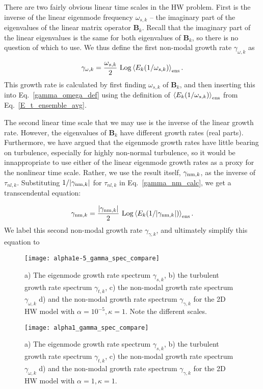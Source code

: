 \documentclass[letter,scriptaddress,twocolumn, prl,showkeys]{revtex4}
\def\beq{\begin{equation}}
\def\eeq{\end{equation}}
\begin{document}
There are two fairly obvious linear time scales in the HW problem. First is the inverse of the linear eigenmode frequency $\omega_{s,k}$
-- the imaginary part of the eigenvalues of the linear matrix operator $\mathbf{B}_k$.
Recall that the imaginary part of the linear eigenvalues is the same for both eigenvalues of $\mathbf{B}_k$, so there is no question of which to use. We thus define the first non-modal
growth rate $\gamma_{\omega,k}$ as

\beq
\label{gamma_omega_def}
\gamma_{\omega,k} = \frac{\omega_{s,k}}{2} \ {\rm{Log}} \left< E_k(1/\omega_{s,k}) \right>_{\rm{ens}}.
\eeq
This growth rate is calculated by first finding $\omega_{s,k}$ of $\mathbf{B}_k$, and then inserting this into Eq.~\ref{gamma_omega_def} using the definition of 
$\left< E_k(1/\omega_{s,k}) \right>_{\rm{ens}}$ from Eq.~\ref{E_t_ensemble_avg}.

The second linear time scale that we may use is the inverse of the linear growth rate. However, the eigenvalues of $\mathbf{B}_k$ have different growth rates (real parts). 
Furthermore, we have argued that the eigenmode growth rates have little bearing on turbulence, especially for highly non-normal turbulence, 
so it would be innappropriate to use either of the linear eigenmode growth rates as a proxy for the nonlinear time scale.
Rather, we use the result itself, $\gamma_{{\rm{nm}},k}$, as the inverse of $\tau_{nl,k}$. Substituting $1/|\gamma_{{\rm{nm}},k}|$ for $\tau_{nl,k}$ in Eq.~\ref{gamma_nm_calc}, we get
a transcendental equation:

\beq
\label{trans_gamma_nm}
\gamma_{{\rm{nm}},k} = \frac{|\gamma_{{\rm{nm}},k}|}{2} \ {\rm{Log}} \left< E_k(1/|\gamma_{{\rm{nm}},k}|) \right>_{\rm{ens}}.
\eeq
We label this second non-modal growth rate $\gamma_{\gamma,k}$, and ultimately simplify this equation to

\begin{figure}
\centerline{\texttt{[image: alpha1e-5\_gamma\_spec\_compare]}}
\caption{a) The eigenmode growth rate spectrum $\gamma_{s,k}$,  b) the turbulent growth rate spectrum $\gamma_{t,k}$, c) the non-modal growth rate spectrum $\gamma_{\omega,k}$ d) and the 
non-modal growth rate spectrum $\gamma_{\gamma,k}$ for the 2D HW model with $\alpha = 10^{-5}, \kappa=1$. Note the different scales.}
\label{alpha1e-5_gamma_spec_compare}
\end{figure}

\begin{figure}
\centerline{\texttt{[image: alpha1\_gamma\_spec\_compare]}}
\caption{a) The eigenmode growth rate spectrum $\gamma_{s,k}$,  b) the turbulent growth rate spectrum $\gamma_{t,k}$, c) the non-modal growth rate spectrum $\gamma_{\omega,k}$ d) and the 
non-modal growth rate spectrum $\gamma_{\gamma,k}$ for the 2D HW model with $\alpha = 1, \kappa=1$.}
\label{alpha1_gamma_spec_compare}
\end{figure}
\end{document}
